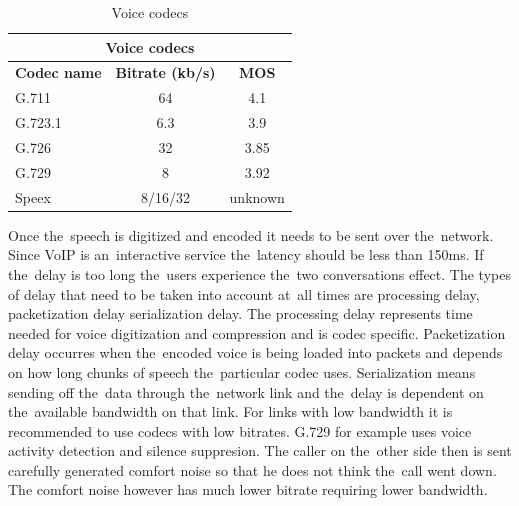 \begin{table}
\begin{center}
\begin{tabular}{|l|c|c|}
	\hline
	\multicolumn{3}{|c|}{\textbf{Voice codecs}}	\\
	\hline
		\textbf{Codec name} & \textbf{Bitrate (kb/s)} & \textbf{MOS} \\
	\hline
	G.711	& 64 & 4.1 \\
	\hline
	G.723.1 & 6.3 & 3.9 \\
	\hline
	G.726 & 32 & 3.85 \\ 
	\hline
	G.729 & 8  & 3.92 \\ 
	\hline
	Speex	& 8/16/32 & unknown \\
	\hline	
\end{tabular}
\end{center}
\label{tab:voipCodecs}
\caption{Voice codecs\cite{voipPaper}}
\end{table}

Once the~speech is digitized and encoded it needs to be sent over the~network. Since VoIP is an~interactive service the~latency should be less than 150ms. If the~delay is too long the~users experience the~two conversations effect. The types of delay that need to be taken into account at~all times are processing delay, packetization delay serialization delay. The processing delay represents time needed for voice digitization and compression and is codec specific. Packetization delay occurres when the~encoded voice is being loaded into packets and depends on how long chunks of speech the~particular codec uses. Serialization means sending off the~data through the~network link and the~delay is dependent on the~available bandwidth on that link. For links with low bandwidth it is recommended to use codecs with low bitrates. G.729 for example uses voice activity detection and silence suppresion. The caller on the~other side then is sent carefully generated comfort noise so that he does not think the~call went down. The comfort noise however has much lower bitrate requiring lower bandwidth.

